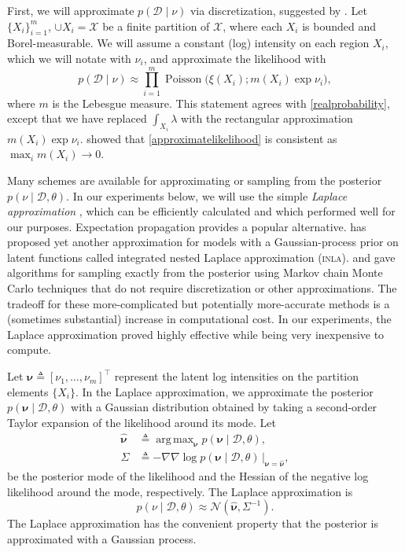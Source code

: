\documentclass{article}
\newcommand{\deq}{\triangleq}
\newcommand{\cm}[1]{\mathcal{#1}}
\newcommand{\data}{\cm{D}}
\newcommand{\given}{\mid}
\DeclareMathOperator{\poisson}{Poisson}
\DeclareMathOperator*{\argmax}{arg\,max}
\begin{document}
First, we will approximate $p(\data \given \nu)$ via discretization,
suggested by \citet{moller}.  Let $\lbrace X_i \rbrace_{i=1}^m$, $\cup
X_i = \cm{X}$ be a finite partition of $\cm{X}$, where each $X_i$ is
bounded and Borel-measurable. We will assume a constant (log)
intensity on each region $X_i$, which we will notate with $\nu_i$, and
approximate the likelihood with
\begin{equation}
  \label{approximatelikelihood}
  p(\data \given \nu) 
  \approx
  \prod_{i=1}^m
  \poisson\bigl(\xi(X_i); m(X_i) \exp \nu_i\bigr),
\end{equation}
where $m$ is the Lebesgue measure.  This statement agrees with
\eqref{realprobability}, except that we have replaced $\int_{X_i}
\lambda$ with the rectangular approximation $m(X_i) \exp \nu_i$.
\citet{ghosh} showed that \eqref{approximatelikelihood} is consistent
as $\max_i m(X_i) \to 0$.

Many schemes are available for approximating or sampling from the
posterior $p(\nu \given \data, \theta)$.  In our experiments below, we
will use the simple \emph{Laplace approximation}
\citep{williamsbarber}, which can be efficiently calculated and which
performed well for our purposes.  Expectation propagation
\citep{minka} provides a popular alternative.  \citet{inla} has
proposed yet another approximation for models with a Gaussian-process
prior on latent functions called integrated nested Laplace
approximation (\textsc{inla}). \citet{adams} and \citet{ess} gave
algorithms for sampling exactly from the posterior using Markov chain
Monte Carlo techniques that do not require discretization or other
approximations.  The tradeoff for these more-complicated but
potentially more-accurate methods is a (sometimes substantial)
increase in computational cost.  In our experiments, the Laplace
approximation proved highly effective while being very inexpensive to
compute.

Let $\bm{\nu} \deq [\nu_1, \dotsc, \nu_m]^\top$ represent the latent
log intensities on the partition elements $\lbrace X_i \rbrace$.  In
the Laplace approximation, we approximate the posterior $p(\bm{\nu}
\given \data, \theta)$ with a Gaussian distribution obtained by taking
a second-order Taylor expansion of the likelihood around its mode.
Let
\begin{align*}
  \hat{\bm{\nu}}
  &\deq 
  \argmax_{\bm{\nu}} p(\bm{\nu} \given \data, \theta), \\
  \Sigma 
  &\deq 
  -\nabla\nabla \log p(\bm{\nu} \given \data, \theta)
  \,
  \Bigr\rvert_{\bm{\nu} = \hat{\bm{\nu}}},
\end{align*}
be the posterior mode of the likelihood and the Hessian of the
negative log likelihood around the mode, respectively.  The Laplace
approximation is 
\begin{equation*}
  p(\nu \given \data, \theta) 
  \approx
  \cm{N}(\hat{\bm{\nu}}, \Sigma^{-1}).
\end{equation*}
The Laplace approximation has the convenient property that the
posterior is approximated with a Gaussian process.
\end{document}
